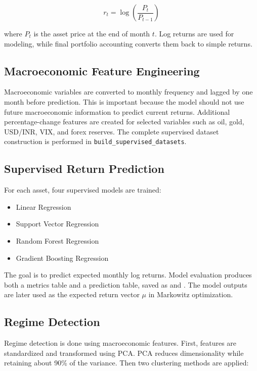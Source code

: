 \documentclass[11pt,a4paper]{article}
\begin{document}
\[
r_t = \log\left(\frac{P_t}{P_{t-1}}\right)
\]

where \(P_t\) is the asset price at the end of month \(t\). Log returns are used for modeling, while final portfolio accounting converts them back to simple returns.

\subsection{Macroeconomic Feature Engineering}

Macroeconomic variables are converted to monthly frequency and lagged by one month before prediction. This is important because the model should not use future macroeconomic information to predict current returns. Additional percentage-change features are created for selected variables such as oil, gold, USD/INR, VIX, and forex reserves. The complete supervised dataset construction is performed in \texttt{build\_supervised\_datasets}.

\subsection{Supervised Return Prediction}

For each asset, four supervised models are trained:

\begin{itemize}[leftmargin=*]
    \item Linear Regression
    \item Support Vector Regression
    \item Random Forest Regression
    \item Gradient Boosting Regression
\end{itemize}

The goal is to predict expected monthly log returns. Model evaluation produces both a metrics table and a prediction table, saved as  and . The model outputs are later used as the expected return vector \(\mu\) in Markowitz optimization.

\subsection{Regime Detection}

Regime detection is done using macroeconomic features. First, features are standardized and transformed using PCA. PCA reduces dimensionality while retaining about 90\% of the variance. Then two clustering methods are applied:
\end{document}
